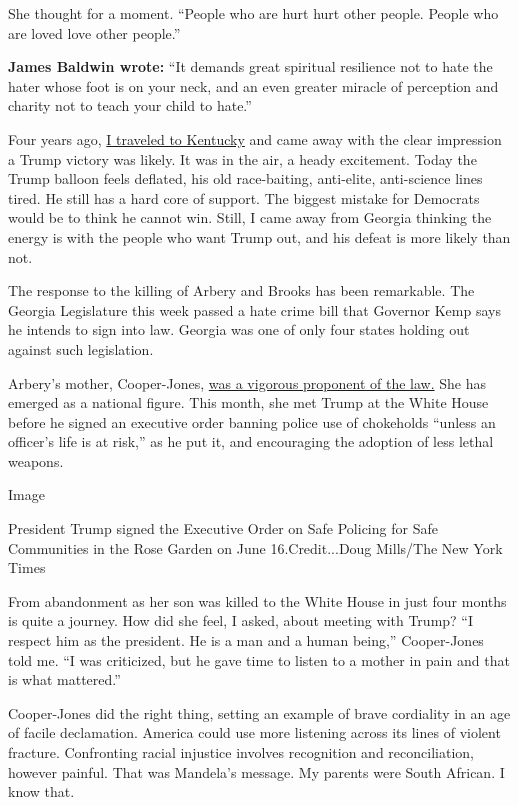 She thought for a moment. ``People who are hurt hurt other people.
People who are loved love other people.''

\textbf{James Baldwin wrote:} ``It demands great spiritual resilience
not to hate the hater whose foot is on your neck, and an even greater
miracle of perception and charity not to teach your child to hate.''

Four years ago,
\href{https://www.nytimes.com/2016/09/11/opinion/sunday/we-need-somebody-spectacular-views-from-trump-country.html}{I
traveled to Kentucky} and came away with the clear impression a Trump
victory was likely. It was in the air, a heady excitement. Today the
Trump balloon feels deflated, his old race-baiting, anti-elite,
anti-science lines tired. He still has a hard core of support. The
biggest mistake for Democrats would be to think he cannot win. Still, I
came away from Georgia thinking the energy is with the people who want
Trump out, and his defeat is more likely than not.

The response to the killing of Arbery and Brooks has been remarkable.
The Georgia Legislature this week passed a hate crime bill that Governor
Kemp says he intends to sign into law. Georgia was one of only four
states holding out against such legislation.

Arbery's mother, Cooper-Jones,
\href{https://www.nytimes.com/2020/06/09/opinion/hate-crime-bill-ahmaud-arbery.html}{was
a vigorous proponent of the law.} She has emerged as a national figure.
This month, she met Trump at the White House before he signed an
executive order banning police use of chokeholds ``unless an officer's
life is at risk,'' as he put it, and encouraging the adoption of less
lethal weapons.

Image

President Trump signed the Executive Order on Safe Policing for Safe
Communities in the Rose Garden on June 16.Credit...Doug Mills/The New
York Times

From abandonment as her son was killed to the White House in just four
months is quite a journey. How did she feel, I asked, about meeting with
Trump? ``I respect him as the president. He is a man and a human
being,'' Cooper-Jones told me. ``I was criticized, but he gave time to
listen to a mother in pain and that is what mattered.''

Cooper-Jones did the right thing, setting an example of brave cordiality
in an age of facile declamation. America could use more listening across
its lines of violent fracture. Confronting racial injustice involves
recognition and reconciliation, however painful. That was Mandela's
message. My parents were South African. I know that.

